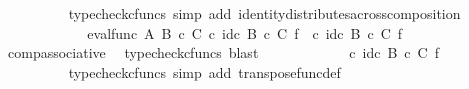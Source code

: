 \begin{isabellebody}
\ \ \ \ \ \ \ \ \isamarkupfalse%
\ {\isacharparenleft}{\kern0pt}typecheck{\isacharunderscore}{\kern0pt}cfuncs{\isacharcomma}{\kern0pt}\ simp\ add{\isacharcolon}{\kern0pt}\ identity{\isacharunderscore}{\kern0pt}distributes{\isacharunderscore}{\kern0pt}across{\isacharunderscore}{\kern0pt}composition{\isacharparenright}{\kern0pt}\isanewline
\ \ \ \ \ \ \isamarkupfalse%
\ \isamarkupfalse%
\ {\isachardoublequoteopen}{\isachardot}{\kern0pt}{\isachardot}{\kern0pt}{\isachardot}{\kern0pt}\ {\isacharequal}{\kern0pt}\ {\isacharparenleft}{\kern0pt}\ eval{\isacharunderscore}{\kern0pt}func\ A\ {\isacharparenleft}{\kern0pt}B\ {\isasymtimes}\isactrlsub c\ C{\isacharparenright}{\kern0pt}\ {\isasymcirc}\isactrlsub c\ {\isacharparenleft}{\kern0pt}id\isactrlsub c\ {\isacharparenleft}{\kern0pt}B\ {\isasymtimes}\isactrlsub c\ C{\isacharparenright}{\kern0pt}\ {\isasymtimes}\isactrlsub f\ {\isacharparenleft}{\kern0pt}{\isasympsi}\isactrlsup {\isasymsharp}{\isacharparenright}{\kern0pt}{\isacharparenright}{\kern0pt}{\isacharparenright}{\kern0pt}\ {\isasymcirc}\isactrlsub c\ {\isacharparenleft}{\kern0pt}id\isactrlsub c\ {\isacharparenleft}{\kern0pt}B\ {\isasymtimes}\isactrlsub c\ C{\isacharparenright}{\kern0pt}\ {\isasymtimes}\isactrlsub f\ {\isasymphi}\isactrlsup {\isasymsharp}\isactrlsup {\isasymsharp}{\isacharparenright}{\kern0pt}{\isachardoublequoteclose}\isanewline
\ \ \ \ \ \ \ \ \isamarkupfalse%
\ comp{\isacharunderscore}{\kern0pt}associative{}\ \isamarkupfalse%
\ {\isacharparenleft}{\kern0pt}typecheck{\isacharunderscore}{\kern0pt}cfuncs{\isacharcomma}{\kern0pt}\ blast{\isacharparenright}{\kern0pt}\isanewline
\ \ \ \ \ \ \isamarkupfalse%
\ \isamarkupfalse%
\ {\isachardoublequoteopen}{\isachardot}{\kern0pt}{\isachardot}{\kern0pt}{\isachardot}{\kern0pt}\ {\isacharequal}{\kern0pt}\ {\isasympsi}\ {\isasymcirc}\isactrlsub c\ {\isacharparenleft}{\kern0pt}id\isactrlsub c\ {\isacharparenleft}{\kern0pt}B\ {\isasymtimes}\isactrlsub c\ C{\isacharparenright}{\kern0pt}\ {\isasymtimes}\isactrlsub f\ {\isasymphi}\isactrlsup {\isasymsharp}\isactrlsup {\isasymsharp}{\isacharparenright}{\kern0pt}{\isachardoublequoteclose}\isanewline
\ \ \ \ \ \ \ \ \isamarkupfalse%
\ {\isacharparenleft}{\kern0pt}typecheck{\isacharunderscore}{\kern0pt}cfuncs{\isacharcomma}{\kern0pt}\ simp\ add{\isacharcolon}{\kern0pt}\ transpose{\isacharunderscore}{\kern0pt}func{\isacharunderscore}{\kern0pt}def{\isacharparenright}{\kern0pt}\isanewline
\ \ \ \ \ \ \isamarkupfalse%

\end{isabellebody}
